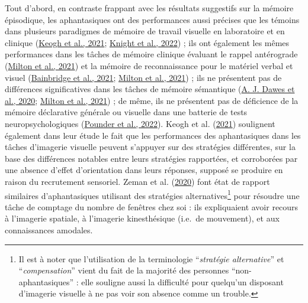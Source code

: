 \documentclass[
  12pt,
]{article}
\begin{document}
Tout d'abord, en contraste frappant avec les résultats suggestifs sur la
mémoire épisodique, les aphantasiques ont des performances aussi
précises que les témoins dans plusieurs paradigmes de mémoire de travail
visuelle en laboratoire et en clinique
(\protect\hyperlink{ref-keoghVisualWorkingMemory2021}{Keogh et al.,
2021}; \protect\hyperlink{ref-knightMemoryImageryNo2022}{Knight et al.,
2022}) ; ils ont également les mêmes performances dans les tâches de
mémoire clinique évaluant le rappel antérograde
(\protect\hyperlink{ref-miltonBehavioralNeuralSignatures2021}{Milton et
al., 2021}) et la mémoire de reconnaissance pour le matériel verbal et
visuel
(\protect\hyperlink{ref-bainbridgeQuantifyingAphantasiaDrawing2021}{Bainbridge
et al., 2021};
\protect\hyperlink{ref-miltonBehavioralNeuralSignatures2021}{Milton et
al., 2021}) ; ils ne présentent pas de différences significatives dans
les tâches de mémoire sémantique
(\protect\hyperlink{ref-dawesCognitiveProfileMultisensory2020}{A. J.
Dawes et al., 2020};
\protect\hyperlink{ref-miltonBehavioralNeuralSignatures2021}{Milton et
al., 2021}) ; de même, ils ne présentent pas de déficience de la mémoire
déclarative générale ou visuelle dans une batterie de tests
neuropsychologiques
(\protect\hyperlink{ref-pounderOnlyMinimalDifferences2022}{Pounder et
al., 2022}). Keogh et al.
(\protect\hyperlink{ref-keoghVisualWorkingMemory2021}{2021}) soulignent
également dans leur étude le fait que les performances des aphantasiques
dans les tâches d'imagerie visuelle peuvent s'appuyer sur des stratégies
différentes, sur la base des différences notables entre leurs stratégies
rapportées, et corroborées par une absence d'effet d'orientation dans
leurs réponses, supposé se produire en raison du recrutement sensoriel.
Zeman et al.
(\protect\hyperlink{ref-zemanPhantasiaPsychologicalSignificance2020}{2020})
font état de rapport similaires d'aphantasiques utilisant des stratégies
alternatives\footnote{Il est à noter que l'utilisation de la
  terminologie ``\emph{stratégie alternative}'' et
  ``\emph{compensation}'' vient du fait de la majorité des personnes
  ``non-aphantasiques'' : elle souligne aussi la difficulté pour
  quelqu'un disposant d'imagerie visuelle à ne pas voir son absence
  comme un trouble.} pour résoudre une tâche de comptage du nombre de
fenêtres chez soi : ils expliquaient avoir recours à l'imagerie
spatiale, à l'imagerie kinesthésique (i.e.~de mouvement), et aux
connaissances amodales.
\end{document}
